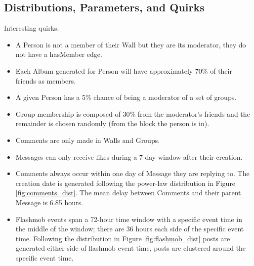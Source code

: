 \subsection{Distributions, Parameters, and Quirks}
\label{sec:distr-param}

Interesting quirks:
\begin{itemize}
\item A Person is not a member of their Wall but they are its moderator, they do not have a hasMember edge.
\item Each Album generated for Person will have approximately 70\% of their friends as members.
\item A given Person has a 5\% chance of being a moderator of a set of groups.
\item Group membership is composed of 30\% from the moderator's friends and the remainder is chosen randomly (from the block the person is in).
\item Comments are only made in Walls and Groups.
\item Messages can only receive likes during a 7-day window after their creation.
\item Comments always occur within one day of Message they are replying to. The creation date is generated following the power-law distribution in Figure \ref{fig:comments_dist}. The mean delay between Comments and their parent Message is 6.85 hours.
\item Flashmob events span a 72-hour time window with a specific event time in the middle of the window; there are 36 hours each side of the specific event time. Following the distribution in Figure \ref{fig:flashmob_dist} posts are generated either side of flashmob event time, posts are clustered around the specific event time.
\end{itemize}

